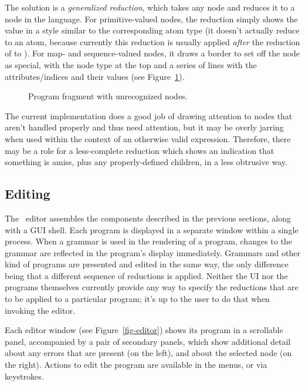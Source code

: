 The solution is a \emph{generalized reduction}, which takes any node and reduces it to a node in the  language. For primitive-valued nodes, the reduction simply shows the value in a style similar to the corresponding  atom type (it doesn't actually reduce to an atom, because currently this reduction is usually applied \emph{after} the reduction of  to ). For map- and sequence-valued nodes, it draws a border to set off the node as special, with the node type at the top and a series of lines with the attributes/indices and their values (see Figure\ \ref{fig-general}).

\begin{figure}[ht]
\caption{\label{fig-general} Program fragment with unrecognized nodes.}
\end{figure}

The current implementation does a good job of drawing attention to nodes that aren't handled properly and thus need attention, but it may be overly jarring when used within the context of an otherwise valid expression. Therefore, there may be a role for a less-complete reduction which shows an indication that something is amiss, plus any properly-defined children, in a less obtrusive way.


%
%
\subsection{Editing}
The \Meta\ editor assembles the components described in the previous sections, along with a GUI shell. Each program is displayed in a separate window within a single process. When a grammar is used in the rendering of a program, changes to the grammar are reflected in the program's display immediately. Grammars and other kind of programs are presented and edited in the same way, the only difference being that a different sequence of reductions is applied. Neither the UI nor the programs themselves currently provide any way to specify the reductions that are to be applied to a particular program; it's up to the user to do that when invoking the editor.

Each editor window (see Figure\ \ref{fig-editor}) shows its program in a scrollable panel, accompanied by a pair of secondary panels, which show additional detail about any errors that are present (on the left), and about the selected node (on the right). Actions to edit the program are available in the menus, or via keystrokes. 

